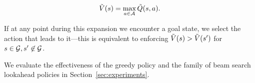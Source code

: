 \begin{equation}
  \tilde{V}(s) = \max_{a \in \mathcal{A}} \tilde{Q}(s, a).
\end{equation}


If at any point during this expansion we encounter a goal state, we select the
action that leads to it---this is equivalent to enforcing
$\tilde{V}(s{}) > \tilde{V}(s{}')$ for $s{} \in
\mathcal{G}{}, s{}' \not\in \mathcal{G}{}$.

We evaluate the effectiveness of the greedy policy and the family of beam search
lookahead policies in Section~\ref{sec:experiments}.
